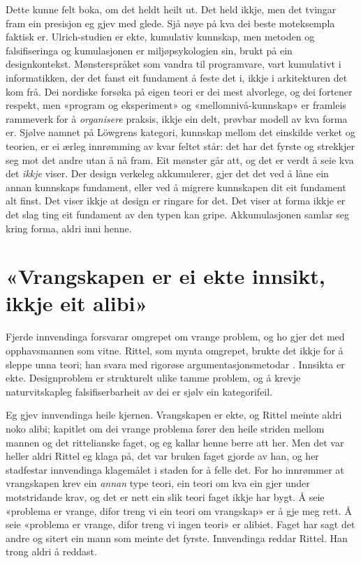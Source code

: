 Dette kunne felt boka, om det heldt heilt ut. Det held ikkje, men det tvingar fram ein presisjon eg gjev med glede. Sjå nøye på kva dei beste moteksempla faktisk er. Ulrich-studien er ekte, kumulativ kunnskap, men metoden og falsifiseringa og kumulasjonen er miljøpsykologien sin, brukt på ein designkontekst. Mønsterspråket som vandra til programvare, vart kumulativt i informatikken, der det fanst eit fundament å feste det i, ikkje i arkitekturen det kom frå. Dei nordiske forsøka på eigen teori er dei mest alvorlege, og dei fortener respekt, men «program og eksperiment» og «mellomnivå-kunnskap» er framleis rammeverk for å \emph{organisere} praksis, ikkje ein delt, prøvbar modell av kva forma er. Sjølve namnet på Löwgrens kategori, kunnskap mellom det einskilde verket og teorien, er ei ærleg innrømming av kvar feltet står: det har det fyrste og strekkjer seg mot det andre utan å nå fram. Eit mønster går att, og det er verdt å seie kva det \emph{ikkje} viser. Der design verkeleg akkumulerer, gjer det det ved å låne ein annan kunnskaps fundament, eller ved å migrere kunnskapen dit eit fundament alt finst. Det viser ikkje at design er ringare for det. Det viser at forma ikkje er det slag ting eit fundament av den typen kan gripe. Akkumulasjonen samlar seg kring forma, aldri inni henne.

\section{«Vrangskapen er ei ekte innsikt, ikkje eit alibi»}

Fjerde innvendinga forsvarar omgrepet om vrange problem, og ho gjer det med opphavsmannen som vitne. Rittel, som mynta omgrepet, brukte det ikkje for å sleppe unna teori; han svara med rigorøse argumentasjonsmetodar \autocite{rittel1973}. Innsikta er ekte. Designproblem er strukturelt ulike tamme problem, og å krevje naturvitskapleg falsifiserbarheit av dei er sjølv ein kategorifeil.

Eg gjev innvendinga heile kjernen. Vrangskapen er ekte, og Rittel meinte aldri noko alibi; kapitlet om dei vrange problema fører den heile striden mellom mannen og det rittelianske faget, og eg kallar henne berre att her. Men det var heller aldri Rittel eg klaga på, det var bruken faget gjorde av han, og her stadfestar innvendinga klagemålet i staden for å felle det. For ho innrømmer at vrangskapen krev ein \emph{annan} type teori, ein teori om kva ein gjer under motstridande krav, og det er nett ein slik teori faget ikkje har bygt. Å seie «problema er vrange, difor treng vi ein teori om vrangskap» er å gje meg rett. Å seie «problema er vrange, difor treng vi ingen teori» er alibiet. Faget har sagt det andre og sitert ein mann som meinte det fyrste. Innvendinga reddar Rittel. Han trong aldri å reddast.

